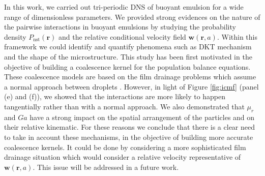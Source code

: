 \documentclass[9pt,a4paper]{article}
\begin{document}
In this work, we carried out tri-periodic DNS of buoyant emulsion for a wide range of dimensionless parameters. 
We provided strong evidences on the nature of the pairwise interactions in buoyant emulsions by studying the probability density $P_\text{nst}(\textbf{r})$ and the relative conditional velocity field $\textbf{w}(\textbf{r},a)$. 
Within this framework  we could identify and quantify phenomena such as DKT mechanism and the shape of the microstructure. 
This study has been first motivated in the objective of building a coalescence kernel for the population balance equations. 
These coalescence models are based on the film drainage problems which assume a normal approach between droplets \cite{chesters1991modelling}.  
However, in light of Figure \ref{fig:icmf} (panel (e) and (f)), we showed that the interactions are more likely to happen tangentially rather than with a normal approach. 
We also demonstrated that $\mu_r$ and $Ga$ have a strong impact on the spatial arrangement of the particles and on their relative kinematic. 
For these reasons we conclude that there is a clear need to take in account these mechanisms, in the objective of building more accurate coalescence kernels. 
It could be done by considering a more sophisticated film drainage situation which would consider a relative velocity representative of $\textbf{w}(\textbf{r},a)$. 
This issue will be addressed in a future work.  




\end{document}
